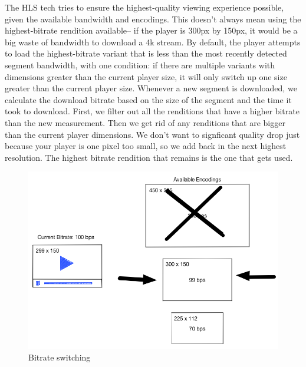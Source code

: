 The HLS tech tries to ensure the highest-quality viewing experience possible, given the available bandwidth and encodings. This doesn't always mean using the highest-bitrate rendition available-- if the player is 300px by 150px, it would be a big waste of bandwidth to download a 4k stream. By default, the player attempts to load the highest-bitrate variant that is less than the most recently detected segment bandwidth, with one condition: if there are multiple variants with dimensions greater than the current player size, it will only switch up one size greater than the current player size.
Whenever a new segment is downloaded, we calculate the download bitrate based on the size of the segment and the time it took to download.
First, we filter out all the renditions that have a higher bitrate than the new measurement.
Then we get rid of any renditions that are bigger than the current player dimensions.
We don't want to signficant quality drop just because your player is one pixel too small, so we add back in the next highest resolution. The highest bitrate rendition that remains is the one that gets used.\cite{videojs_asb}


\begin{figure}[htb] %
 \centering
 \includegraphics[width=0.8\linewidth]{images/chapter2/bitrate-switching-4.png}\hfill
 \caption[Bitrate switching]{Bitrate switching}
 \label{fig:fourV}
\end{figure}



\newpage